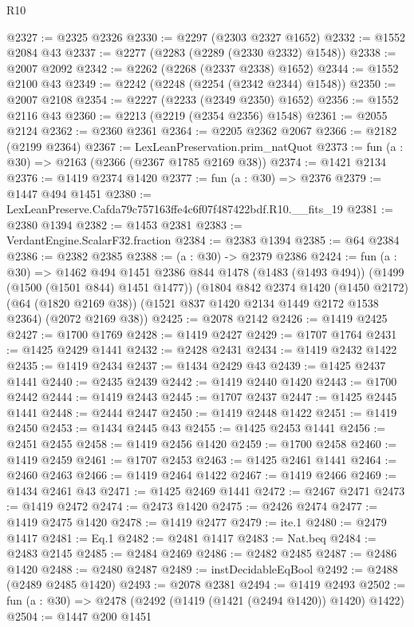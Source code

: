 \begin{lexlean}{R10}
\begin{coremodule}
@2327 := @2325 @2326
@2330 := @2297 (@2303 @2327 @1652)
@2332 := @1552 @2084 @43
@2337 := @2277 (@2283 (@2289 (@2330 @2332) @1548))
@2338 := @2007 @2092
@2342 := @2262 (@2268 (@2337 @2338) @1652)
@2344 := @1552 @2100 @43
@2349 := @2242 (@2248 (@2254 (@2342 @2344) @1548))
@2350 := @2007 @2108
@2354 := @2227 (@2233 (@2349 @2350) @1652)
@2356 := @1552 @2116 @43
@2360 := @2213 (@2219 (@2354 @2356) @1548)
@2361 := @2055 @2124
@2362 := @2360 @2361
@2364 := @2205 @2362 @2067
@2366 := @2182 (@2199 @2364)
@2367 := LexLeanPreservation.prim_natQuot
@2373 := fun (a : @30) => @2163 (@2366 (@2367 @1785 @2169 @38))
@2374 := @1421 @2134
@2376 := @1419 @2374 @1420
@2377 := fun (a : @30) => @2376
@2379 := @1447 @494 @1451
@2380 := LexLeanPreserve.Cafda79c757163ffe4c6f07f487422bdf.R10.__fits_19
@2381 := @2380 @1394
@2382 := @1453 @2381
@2383 := VerdantEngine.ScalarF32.fraction
@2384 := @2383 @1394
@2385 := @64 @2384
@2386 := @2382 @2385
@2388 := (a : @30) -> @2379 @2386
@2424 := fun (a : @30) =>
  @1462
    @494
    @1451
    @2386
    @844
    @1478
    (@1483 (@1493 @494))
    (@1499 (@1500 (@1501 @844) @1451 @1477))
    (@1804
      @842
      @2374
      @1420
      (@1450 @2172)
      (@64 (@1820 @2169 @38))
      (@1521 @837 @1420 @2134 @1449 @2172 @1538 @2364)
      (@2072 @2169 @38))
@2425 := @2078 @2142
@2426 := @1419 @2425
@2427 := @1700 @1769
@2428 := @1419 @2427
@2429 := @1707 @1764
@2431 := @1425 @2429 @1441
@2432 := @2428 @2431
@2434 := @1419 @2432 @1422
@2435 := @1419 @2434
@2437 := @1434 @2429 @43
@2439 := @1425 @2437 @1441
@2440 := @2435 @2439
@2442 := @1419 @2440 @1420
@2443 := @1700 @2442
@2444 := @1419 @2443
@2445 := @1707 @2437
@2447 := @1425 @2445 @1441
@2448 := @2444 @2447
@2450 := @1419 @2448 @1422
@2451 := @1419 @2450
@2453 := @1434 @2445 @43
@2455 := @1425 @2453 @1441
@2456 := @2451 @2455
@2458 := @1419 @2456 @1420
@2459 := @1700 @2458
@2460 := @1419 @2459
@2461 := @1707 @2453
@2463 := @1425 @2461 @1441
@2464 := @2460 @2463
@2466 := @1419 @2464 @1422
@2467 := @1419 @2466
@2469 := @1434 @2461 @43
@2471 := @1425 @2469 @1441
@2472 := @2467 @2471
@2473 := @1419 @2472
@2474 := @2473 @1420
@2475 := @2426 @2474
@2477 := @1419 @2475 @1420
@2478 := @1419 @2477
@2479 := ite.{1}
@2480 := @2479 @1417
@2481 := Eq.{1}
@2482 := @2481 @1417
@2483 := Nat.beq
@2484 := @2483 @2145
@2485 := @2484 @2469
@2486 := @2482 @2485
@2487 := @2486 @1420
@2488 := @2480 @2487
@2489 := instDecidableEqBool
@2492 := @2488 (@2489 @2485 @1420)
@2493 := @2078 @2381
@2494 := @1419 @2493
@2502 := fun (a : @30) => @2478 (@2492 (@1419 (@1421 (@2494 @1420)) @1420) @1422)
@2504 := @1447 @200 @1451

\end{coremodule}
\end{lexlean}
